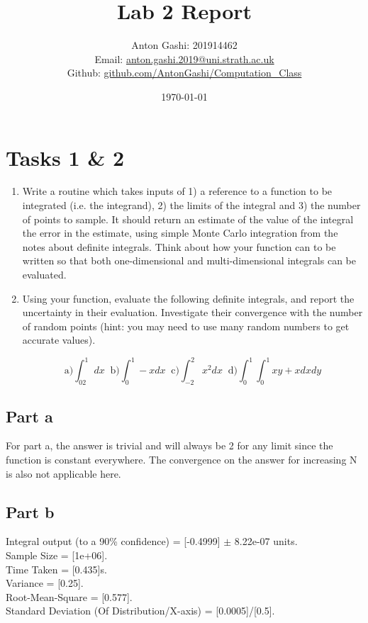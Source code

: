 \documentclass[12pt, A4]{article}
\title{Lab 2 Report}
\author{Anton Gashi: 201914462 \\ Email: \href{anton.gashi.2019@uni.strath.ac.uk}{anton.gashi.2019@uni.strath.ac.uk} \\ Github: \href{https://github.com/AntonGashi/Computation_Class}{github.com/AntonGashi/Computation\_Class}}
\date{\today}
\begin{document}
\begin{titlepage}
\clearpage\maketitle
\thispagestyle{empty}
\end{titlepage}

\section{Tasks 1 \& 2} %
\label{sec:Tasks 12}

\begin{enumerate}
  \item Write a routine which takes inputs of 1) a reference to a function to
be integrated (i.e. the integrand), 2) the limits of the integral and 3)
the number of points to sample. It should return an estimate of the
value of the integral the error in the estimate, using simple Monte
Carlo integration from the notes about definite integrals.
Think about how your function can to be written so that both
one-dimensional and multi-dimensional integrals can be evaluated.

\item Using your function, evaluate the following definite integrals, and
report the uncertainty in their evaluation. Investigate their
convergence with the number of random points (hint: you may need
to use many random numbers to get accurate values).

$$\textrm{a)}\int^1_02dx \;\; \textrm{b)}\int^1_0-xdx \;\; \textrm{c)}\int^2_{-2}x^2dx \;\; \textrm{d)}\int^1_0\int^1_0xy+xdxdy$$
\end{enumerate}

\subsection{Part a} %
\label{sub:Part a}

For part a, the answer is trivial and will always be 2 for any limit since 
the function is constant everywhere. The convergence on the answer for increasing
N is also not applicable here.


\subsection{Part b} %
\label{sub:Part b}


Integral output (to a 90\% confidence) = [-0.4999] $\pm$ 8.22e-07 units.
\\
Sample Size = [1e+06].
\\
Time Taken = [0.435]s.
\\
Variance = [0.25].
\\
Root-Mean-Square = [0.577].
\\
Standard Deviation (Of Distribution/X-axis) = [0.0005]/[0.5].
\end{document}
